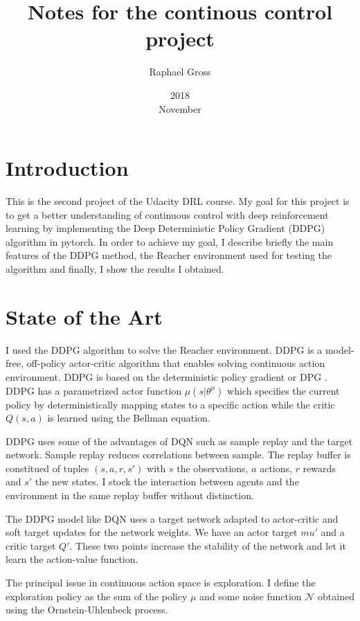 \documentclass[12pt]{article}
\begin{document}
\title{Notes for the continous control project}
\date{2018\\ November}
\author{Raphael Gross}
\maketitle




\section{Introduction}
This is the second project of the Udacity DRL course. My goal for this project is to get a better understanding of continuous control with deep reinforcement learning by implementing the  Deep Deterministic Policy Gradient (DDPG) algorithm in pytorch. In order to achieve my goal, I describe briefly the main features of the DDPG method, the Reacher environment used for testing the algorithm and finally, I show the results I obtained.


\section{State of the Art}

I used the DDPG algorithm to solve the Reacher environment. DDPG is a model-free, off-policy actor-critic algorithm that enables solving continuous action environment. 
DDPG is based on the deterministic policy gradient or DPG \cite{LHDWR14}.
DDPG has a parametrized actor function $\mu(s|{\theta}^{\mu})$ which specifies the current policy by deterministically mapping states to a specific action while the critic $Q(s,a)$ is learned using the Bellman equation.

DDPG uses some of the advantages of DQN such as sample replay and the target network.
Sample replay reduces correlations between sample. The replay buffer is constitued of tuples $(s,a,r,s')$  with $s$ the observations, $a$ actions, $r$ rewards and $s'$ the new states.
I stock the interaction between agents and the environment in the same replay buffer without distinction.

The DDPG model like DQN\cite{mnih2015humanlevel} uses a target network adapted to actor-critic and soft target updates for the network weights. We have an actor target $mu'$ and a critic target $Q'$. These two points increase the stability of the network and let it learn the action-value function. 

The principal issue in continuous action space is exploration. I define the exploration policy as the sum of the policy $\mu$ and some noise function $\mathcal{N}$ obtained using the Ornstein-Uhlenbeck process.
\end{document}

